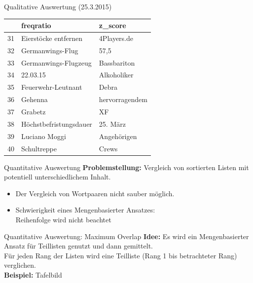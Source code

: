 \documentclass{beamer}
\begin{document}
\begin{frame}{Qualitative Auswertung (25.3.2015)}
\begin{table}[ht]
\centering
\begin{tabular}{rll}
  \hline
 & freqratio & z\_score \\ 
  \hline
31 & Eierstöcke entfernen & 4Players.de \\ 
  32 & Germanwings-Flug & 57,5 \\ 
  33 & Germanwings-Flugzeug & Bassbariton \\ 
  34 & 22.03.15 & Alkoholiker \\ 
  35 & Feuerwehr-Leutnant & Debra \\ 
  36 & Gehenna & hervorragendem \\ 
  37 & Grabetz & XF \\ 
  38 & Höchstbefristungsdauer & 25. März \\ 
  39 & Luciano Moggi & Angehörigen \\ 
  40 & Schultreppe & Crews \\ 
   \hline
\end{tabular}
\end{table}
\end{frame}

\begin{frame}{Quantitative Auswertung}
	\textbf{Problemstellung: }Vergleich von sortierten Listen mit potentiell unterschiedlichem Inhalt.
	\begin{itemize}
		\item{Der Vergleich von Wortpaaren nicht sauber m\"oglich.}
		\item{Schwierigkeit eines Mengenbasierter Ansatzes:\\Reihenfolge wird nicht beachtet }
	\end{itemize}	
\end{frame}


\begin{frame}{Quantitative Auswertung: Maximum Overlap}
	\textbf{Idee: } Es wird ein Mengenbasierter Ansatz f\"ur Teillisten genutzt und dann gemittelt.\\
	F\"ur jeden Rang der Listen wird eine Teilliste (Rang 1 bis betrachteter Rang) verglichen.\\
	\vspace{1cm}
	\textbf{Beispiel:} Tafelbild
\end{frame}
\end{document}
